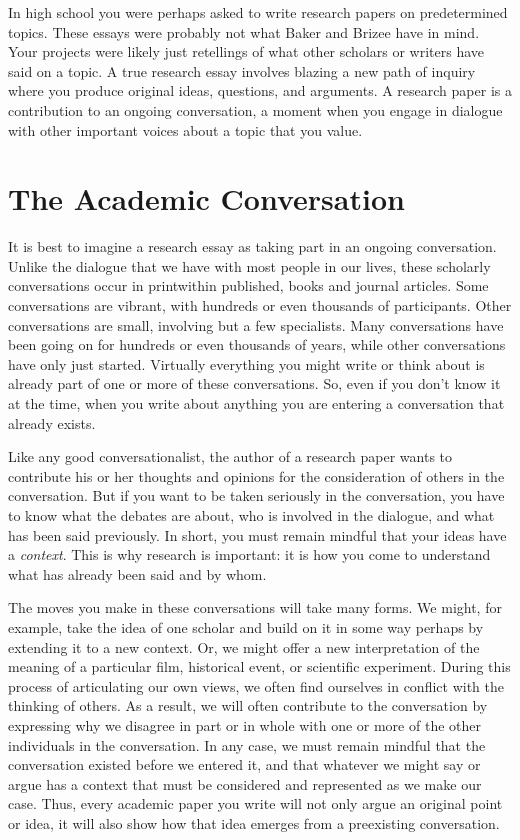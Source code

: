 \noindent In high school you were perhaps asked to write research papers on
predetermined  topics. These essays were probably not what Baker and Brizee have
in mind. Your  projects were likely just retellings of what other scholars or
writers have  said on a topic. A true research essay involves blazing a new path
of inquiry  where you produce original ideas, questions, and arguments. A
research paper is  a contribution to an ongoing conversation, a moment when you
engage in dialogue  with other important voices about a topic that you value.

\section{The Academic Conversation}

It is best to imagine a research essay as taking part in an ongoing
conversation. Unlike the dialogue that we have with most people in our lives,
these scholarly conversations occur in print\textemdash within published,
\hyperlink{peer-review}{\color{Ahrenge}{peer-reviewed}} books and journal articles. Some conversations are vibrant, with
hundreds or even thousands of participants. Other conversations are small,
involving but a few specialists. Many conversations have been going on for
hundreds or even thousands of years, while other conversations have only just started. Virtually everything you might write or think about is already part of
one or more of these conversations. So, even if you don't know it at the time,
when you write about anything you are entering a conversation that already
exists. 

Like any good conversationalist, the author of a research paper wants to
contribute his or her thoughts and opinions for the consideration of others in
the conversation. But if you want to be taken seriously in the conversation, you
have to know what the debates are about, who is involved in the dialogue, and
what has been said previously. In short, you must remain mindful that your ideas
have a \emph{context}. This is why research is important: it is how you come to understand what has already been said and by whom.

The moves you make in these conversations will take many forms. We might, for
example, take the idea of one scholar and build on it in some way\textemdash
perhaps by extending it to a new context. Or, we might offer a new
interpretation of the meaning of a particular film, historical event, or
scientific experiment. During this process of articulating our own views, we
often find ourselves in conflict with the thinking of others. As a result, we
will often contribute to the conversation by expressing why we disagree in part
or in whole with one or more of the other individuals in the conversation. In
any case, we must remain mindful that the conversation existed before we entered
it, and that whatever we might say or argue has a context that must be considered
and represented as we make our case. Thus, every academic paper you write will
not only argue an original point or idea, it will also show how that idea
emerges from a preexisting conversation.


